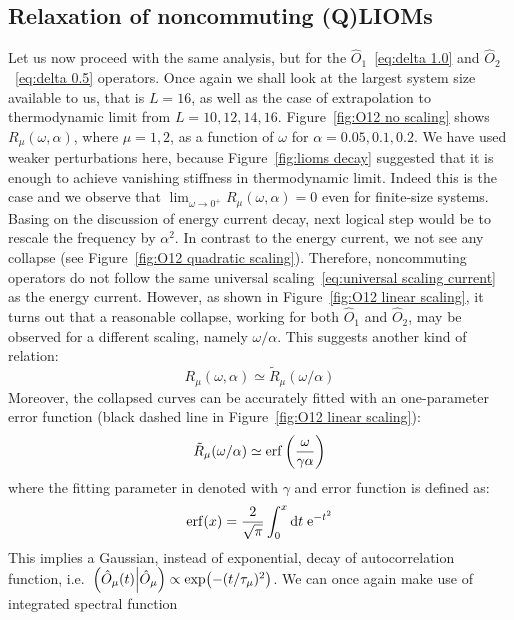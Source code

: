 \subsection{Relaxation of noncommuting (Q)LIOMs}
Let us now proceed with the same analysis, but for the \(\hat{O}_1\)~\eqref{eq:delta 1.0} 
and \(\hat{O}_2\)~\eqref{eq:delta 0.5} operators. Once again we shall look at the largest
system size available to us, that is \(L = 16\), as well as the case of extrapolation
to thermodynamic limit from \(L = 10,12,14,16\). 
Figure~\ref{fig:O12 no scaling} shows
\(R_{\mu}(\omega,\alpha)\), where \(\mu=1,2\), as a function of \(\omega\) for \(\alpha = 0.05,0.1,0.2\).
We have used weaker perturbations here, because Figure~\ref{fig:lioms decay} suggested that
it is enough to achieve vanishing stiffness in thermodynamic limit. Indeed this is the case
and we observe that \(\lim_{{\omega\to 0^{+}}} R_{\mu}(\omega,\alpha) = 0\) even for finite-size systems.
Basing on the discussion of energy current decay, next logical step would be to rescale the
frequency by \(\alpha^2\).
In contrast to the energy current, we not see any collapse (see Figure~\ref{fig:O12 quadratic scaling}).
Therefore, noncommuting operators do not follow the same universal scaling~\eqref{eq:universal scaling current}
as the energy current. However, as shown in Figure~\ref{fig:O12 linear scaling},
it turns out that a reasonable collapse, working for both \(\hat{O}_1\) and \(\hat{O}_2\),
may be observed for a different scaling, namely \(\omega/\alpha\). This suggests another kind
of relation:
\begin{equation}
  R_{\mu}(\omega,\alpha) \simeq \tilde{R}_{\mu}(\omega/\alpha)
\end{equation}
Moreover, the collapsed curves can be accurately fitted with an one-parameter error function
 (black dashed line in Figure~\ref{fig:O12 linear scaling}):
\begin{equation}
  \tilde{R}_{\mu}(\omega/\alpha) \simeq \erf\left(\frac{\omega}{\gamma \alpha}\right)
  \label{eq:erf fit}
\end{equation}
where the fitting parameter in denoted with \(\gamma\) and error function is defined as:
\begin{equation}
\erf(x) = \frac{2}{\sqrt{\pi}} \int_{0}^{x} \mathrm{d}t\; \mathrm{e}^{-t^2}  
\end{equation}
This implies a Gaussian, instead of
exponential, decay of autocorrelation function, i.e.\ \(\left(\hat{O}_{\mu}(t) \middle| \hat{O}_{\mu}\right)
\propto \exp(-(t/\tau_{\mu})^2)\). We can once again make use of integrated spectral function
